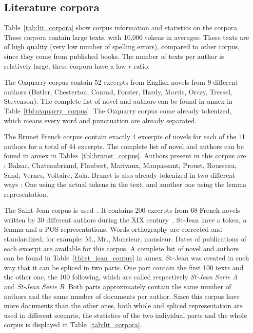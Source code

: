 \subsection{Literature corpora \label{sec:lit_corpus}}

Table~\ref{tab:lit_corpora} show corpus information and statistics on the corpora.
These corpora contain large texts, with 10,000 tokens in averages.
These texts are of high quality (very low number of spelling errors), compared to other corpus, since they come from published books.
The number of texts per author is relatively large, these corpora have a low $r$ ratio.

The Oxquarry corpus contain 52 excerpts from English novels from 9 different authors (Butler, Chesterton, Conrad, Forster, Hardy, Morris, Orczy, Tressel, Stevenson).
The complete list of novel and authors can be found in annex in Table~\ref{tbl:oxquarry_corpus}.
The Oxquarry corpus come already tokenized, which means every word and punctuation are already separated.

The Brunet French corpus contain exactly 4 excerpts of novels for each of the 11 authors for a total of 44 excerpts.
The complete list of novel and authors can be found in annex in Tables~\ref{tbl:brunet_corpus}.
Authors present in this corpus are : Balzac, Chateaubriand, Flaubert, Marivaux, Maupassant, Proust, Rousseau, Sand, Vernes, Voltaire, Zola.
Brunet is also already tokenized in two different ways : One using the actual tokens in the text, and another one using the lemma representation.

The Saint-Jean corpus is used~\cite{unine_corpus}.
It contains 200 excerpts from 68 French novels written by 30 different authors during the XIX century~\cite{st_jean}.
St-Jean have a token, a lemma and a POS representations.
Words orthography are corrected and standardized, for example: M., Mr., Monsieur, monsieur.
Dates of publications of each excerpt are available for this corpus.
A complete list of novel and authors can be found in Table~\ref{tbl:st_jean_corpus} in annex.
St-Jean was created in such way that it can be spliced in two parts.
One part contain the first 100 texts and the other one, the 100 following, which are called respectively \textit{St-Jean Serie A} and \textit{St-Jean Serie B}.
Both parts approximately contain the same number of authors and the same number of documents per author.
Since this corpus have more documents than the other ones, both whole and spliced representation are used in different scenario, the statistics of the two individual parts and the whole corpus is displayed in Table~\ref{tab:lit_corpora}.

